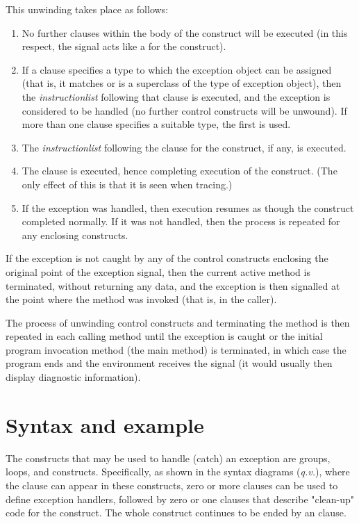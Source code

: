 This unwinding takes place as follows:
\begin{enumerate}
\item No further clauses within the body of the construct will be executed
(in this respect, the signal acts like a  for the
construct).
\item If a  clause specifies a type to which
the exception object can be assigned (that is, it matches or is a
superclass of the type of exception object), then the
\emph{instructionlist} following that clause is executed, and the
exception is considered to be handled (no further control constructs
will be unwound).
If more than one  clause specifies a suitable type, the
first is used.
\item The \emph{instructionlist} following the  clause
for the construct, if any, is executed.
\item The  clause is executed, hence completing execution of
the construct.
(The only effect of this is that it is seen when tracing.)
\item 
If the exception was handled, then execution resumes as though the
construct completed normally.  If it was not handled, then the process
is repeated for any enclosing constructs.
\end{enumerate}
 
If the exception is not caught by any of the control constructs
enclosing the original point of the exception signal, then
the current active method is terminated, without returning any data, and
the exception is then signalled at the point where the method was
invoked (that is, in the caller).
 
The process of unwinding control constructs and terminating the method
is then repeated in each calling method until the exception is caught or
the initial program invocation method (the main method) is terminated,
in which case the program ends and the environment receives the signal
(it would usually then display diagnostic information).
\section{Syntax and example}
 
The constructs that may be used to handle (catch) an exception are
 groups,  loops, and  constructs.
Specifically, as shown in the syntax diagrams (\emph{q.v.}), where the
 clause can appear in these constructs, zero or more
 clauses can be used to define exception handlers,
followed by zero or one  clauses that describe
"clean-up" code for the construct.
The whole construct continues to be ended by an  clause.
 
